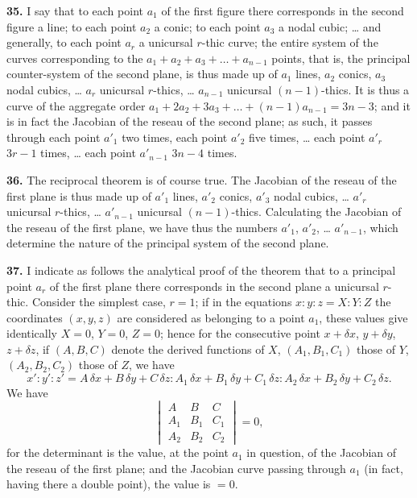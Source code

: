 \documentclass[12pt,a4paper]{article}
\theoremstyle{plain}
\theoremstyle{definition}
\theoremstyle{remark}
\begin{document}
\textbf{35.} I say that to each point $a_1$ of the first figure there corresponds in the second figure a line; to each point $a_2$ a conic; to each point $a_3$ a nodal cubic; \ldots{} and generally, to each point $a_r$ a unicursal $r$-thic curve; the entire system of the curves corresponding to the $a_1 + a_2 + a_3 + \ldots + a_{n-1}$ points, that is, the principal counter-system of the second plane, is thus made up of $a_1$ lines, $a_2$ conics, $a_3$ nodal cubics, \ldots{} $a_r$ unicursal $r$-thics, \ldots{} $a_{n-1}$ unicursal $(n-1)$-thics. It is thus a curve of the aggregate order $a_1 + 2a_2 + 3a_3 + \ldots + (n-1)a_{n-1} = 3n - 3$; and it is in fact the Jacobian of the reseau of the second plane; as such, it passes through each point $a'_1$ two times, each point $a'_2$ five times, \ldots{} each point $a'_r$ $3r - 1$ times, \ldots{} each point $a'_{n-1}$ $3n - 4$ times.

\textbf{36.} The reciprocal theorem is of course true. The Jacobian of the reseau of the first plane is thus made up of $a'_1$ lines, $a'_2$ conics, $a'_3$ nodal cubics, \ldots{} $a'_r$ unicursal $r$-thics, \ldots{} $a'_{n-1}$ unicursal $(n-1)$-thics. Calculating the Jacobian of the reseau of the first plane, we have thus the numbers $a'_1$, $a'_2$, \ldots{} $a'_{n-1}$, which determine the nature of the principal system of the second plane.

\textbf{37.} I indicate as follows the analytical proof of the theorem that to a principal point $a_r$ of the first plane there corresponds in the second plane a unicursal $r$-thic. Consider the simplest case, $r = 1$; if in the equations $x : y : z = X : Y : Z$ the coordinates $(x, y, z)$ are considered as belonging to a point $a_1$, these values give identically $X = 0$, $Y = 0$, $Z = 0$; hence for the consecutive point $x + \delta x$, $y + \delta y$, $z + \delta z$, if $(A, B, C)$ denote the derived functions of $X$, $(A_1, B_1, C_1)$ those of $Y$, $(A_2, B_2, C_2)$ those of $Z$, we have
\[
x' : y' : z' = A\,\delta x + B\,\delta y + C\,\delta z : A_1\,\delta x + B_1\,\delta y + C_1\,\delta z : A_2\,\delta x + B_2\,\delta y + C_2\,\delta z.
\]
We have
\[
\begin{vmatrix}
A & B & C \\
A_1 & B_1 & C_1 \\
A_2 & B_2 & C_2
\end{vmatrix} = 0,
\]
for the determinant is the value, at the point $a_1$ in question, of the Jacobian of the reseau of the first plane; and the Jacobian curve passing through $a_1$ (in fact, having there a double point), the value is $= 0$.
\end{document}
